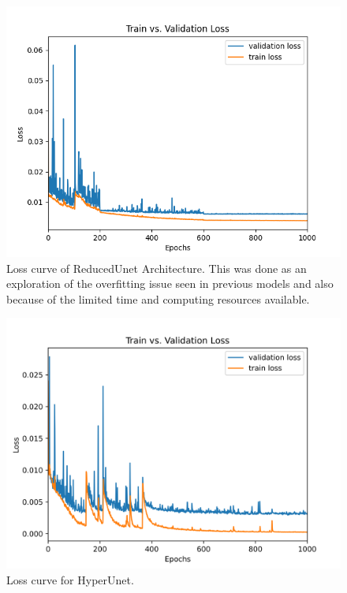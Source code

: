 \documentclass{article}
\begin{document}
\begin{figure}[!htb]
    \centering
    \includegraphics[width=\textwidth]{figs/ReducedUnet/loss_curves/loss_curve.png}
    \caption{Loss curve of ReducedUnet Architecture. This was done as an exploration of the overfitting issue seen in previous models and also because of the limited time and computing resources available.}
    \label{fig:loss_curve_ReducedUnet_model}
\end{figure}
\begin{figure}[!htb]
    \centering
    \includegraphics[width=\textwidth]{figs/ClassicUnet/curves/loss_curve.png}
    \caption{Loss curve for HyperUnet.}
    \label{fig:loss_curve_HyperNet_model}
\end{figure}
\end{document}
